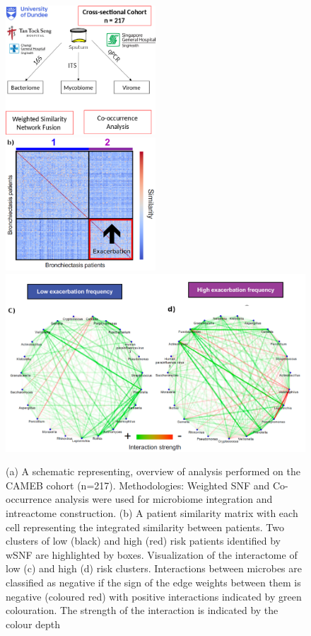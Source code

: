 \begin{figure}[!h]
	\centering
	\includegraphics[width=0.50\textwidth]{./image/methods_masters.png}%
	\includegraphics[width=0.50\textwidth]{./image/Res2.png}\\
	\includegraphics[width=\textwidth]{./image/Res3.png}
	\caption{(a) A schematic representing, overview of analysis performed on the CAMEB cohort (n=217). Methodologies: Weighted SNF and Co-occurrence analysis were used for microbiome integration and intreactome construction. (b) A patient similarity matrix with each cell representing the integrated similarity between patients. Two clusters of low (black) and high (red) risk patients identified by wSNF are highlighted by boxes. Visualization of the interactome of low (c) and high (d) risk clusters. Interactions between microbes are	classified as negative if the sign of the edge weights between them is negative (coloured red) with positive interactions indicated by green colouration. The strength of the interaction is indicated by the colour depth}
	\label{fig2}
\end{figure}

